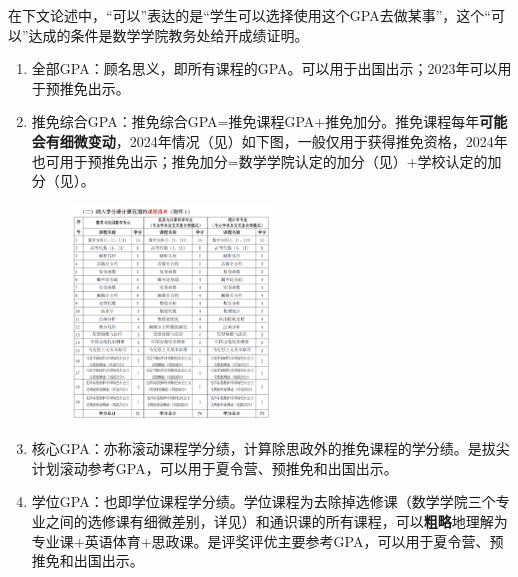 \documentclass[a4paper,11pt,notitlepage]{article}
\newcommand{\empha}[1]{\textbf{#1}}
\begin{document}
\indent 在下文论述中，“可以”表达的是“学生可以选择使用这个GPA去做某事”，这个“可以”达成的条件是数学学院教务处给开成绩证明。
\begin{adjustwidth}{2em}{0pt}
\begin{enumerate}
    \item 全部GPA：顾名思义，即所有课程的GPA。可以用于出国出示；2023年可以用于预推免出示。
    \item 推免综合GPA：推免综合GPA=推免课程GPA+推免加分。推免课程每年\empha{可能会有细微变动}，2024年情况（见\cite{推免}）如下图，一般仅用于获得推免资格，2024年也可用于预推免出示；推免加分=数学学院认定的加分（见\cite{推免}）+学校认定的加分（见\cite{学校加分}）。
    \begin{figure}[ht]
    \centering
    \includegraphics[width=0.5\textwidth]{推免课程.png}
    \end{figure}
    
    \item 核心GPA：亦称滚动课程学分绩，计算除思政外的推免课程的学分绩。是拔尖计划滚动参考GPA，可以用于夏令营、预推免和出国出示。
    \item 学位GPA：也即学位课程学分绩。学位课程为去除掉选修课（数学学院三个专业之间的选修课有细微差别，详见\cite{培养方案}）和通识课的所有课程，可以\empha{粗略}地理解为专业课+英语体育+思政课。是评奖评优主要参考GPA，可以用于夏令营、预推免和出国出示。
    
\end{enumerate}
\end{adjustwidth}
\end{document}
